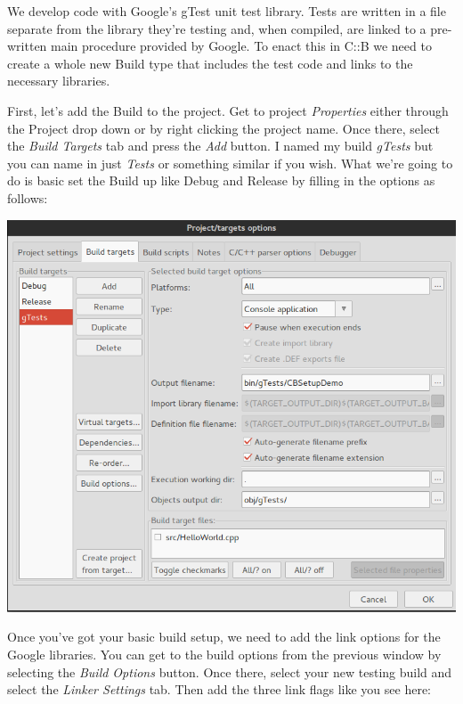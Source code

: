 \documentclass[10pt]{article}
\begin{document}
We develop code with Google's gTest unit test library. Tests are written in a file separate from the library they're testing and, when compiled, are linked to a pre-written main procedure provided by Google. To enact this in C::B we need to create a whole new Build type that includes the test code and links to the necessary libraries.

First, let's add the Build to the project. Get to project \textit{Properties} either through the Project drop down or by right clicking the project name. Once there, select the \textit{Build Targets} tab and press the \textit{Add} button. I named my build \textit{gTests} but you can name in just \textit{Tests} or something similar if you wish.  What we're going to do is basic set the Build up like Debug and Release by filling in the options as follows:

\vspace{.1in}
\begin{center}
\includegraphics[scale=.5]{CB_TestBuildSetup.png}
\end{center}
\vspace{.1in}

Once you've got your basic build setup, we need to add the link options for the Google libraries. You can get to the build options from the previous window by selecting the \textit{Build Options} button.  Once there, select your new testing build and select the \textit{Linker Settings} tab.  Then add the three link flags like you see here:
\end{document}
